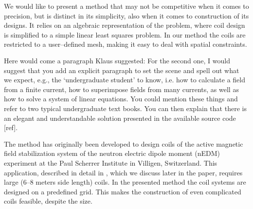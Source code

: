 We would like to present a method that may not be competitive when it comes to precision, but is distinct in its simplicity, also when it comes to construction of its designs. It relies on an algebraic representation of the problem, where coil design is simplified to a simple linear least squares problem. In our method the coils are restricted to a user--defined mesh, making it easy to deal with spatial constraints.


Here would come a paragraph Klaus suggested: For the second one, I would suggest that you add an explicit paragraph to set the scene and
spell out what we expect, e.g., the ‘undergraduate student’ to know, i.e. how to calculate
a field from a finite current, how to superimpose fields from many currents, as well as
how to solve  a system of linear equations. You could mention these things and refer to
two typical undergraduate text books. You can then explain that there is an elegant 
and understandable solution presented in the available source code [ref].

The method has originally been developed to design coils of the active magnetic field stabilization system of the neutron electric dipole moment (nEDM) experiment at the Paul Scherrer Institute in Villigen, Switzerland. This application, described in detail in \cite{Afach2014}, which we discuss later in the paper, requires large (6--8 meters side length) coils. In the presented method the coil systems are designed on a predefined grid. This makes the construction of even complicated coils feasible, despite the size.



